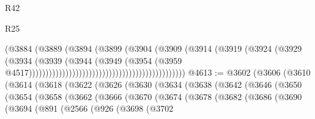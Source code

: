 \begin{lexlean}{R42}
\begin{lexlean}{R25}
\begin{coremodule}
{{{{{{{{{{{{{{{{{{{{{{{{{{{{{{{{{{{{{{{{{{{{{{{{{{{{{{{{{{{{{{{{{{{{{{{{{{{{{{{{{{{{{{{{{{{{{{{{{{{{{{{{{{{{{{{{{{{{{{{{{{{{{{{{{{{{{{{{{{{{{{{{{{{{{{{{{{{{{{{{{{{{{{{{{{{{{{{{{{{{{{{{{{{{{{{{{{{{{{{                                                                  (@3884
                                                                    (@3889
                                                                      (@3894
                                                                        (@3899
                                                                          (@3904
                                                                            (@3909
                                                                              (@3914
                                                                                (@3919
                                                                                  (@3924
                                                                                    (@3929
                                                                                      (@3934
                                                                                        (@3939
                                                                                          (@3944
                                                                                            (@3949
                                                                                              (@3954
                                                                                                (@3959
                                                                                                  @4517)))))))))))))))))))))))))))))))))))))))))))))))
@4613 := @3602
    (@3606
      (@3610
        (@3614
          (@3618
            (@3622
              (@3626
                (@3630
                  (@3634
                    (@3638
                      (@3642
                        (@3646
                          (@3650
                            (@3654
                              (@3658
                                (@3662
                                  (@3666
                                    (@3670
                                      (@3674
                                        (@3678
                                          (@3682
                                            (@3686
                                              (@3690
                                                (@3694
                                                  (@891
                                                    (@2566
                                                      (@926
                                                        (@3698
                                                          (@3702
}}}}}}}}}}}}}}}}}}}}}}}}}}}}}}}}}}}}}}}}}}}}}}}}}}}}}}}}}}}}}}}}}}}}}}}}}}}}}}}}}}}}}}}}}}}}}}}}}}}}}}}}}}}}}}}}}}}}}}}}}}}}}}}}}}}}}}}}}}}}}}}}}}}}}}}}}}}}}}}}}}}}}}}}}}}}}}}}}}}}}}}}}}}}}}}}}}}}}}}
\end{coremodule}
\end{lexlean}
\end{lexlean}
